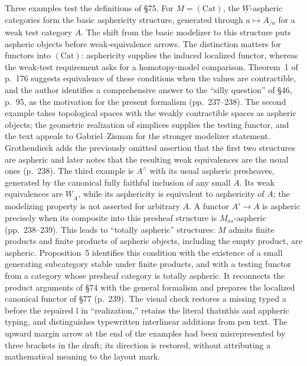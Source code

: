 Three examples test the definitions of \S75. For $M=(\mathrm{Cat})$, the $\underline W$-aspheric categories form the basic asphericity structure, generated through $a\mapsto A_{/a}$ for a weak test category $A$. The shift from the basic modelizer to this structure puts aspheric objects before weak-equivalence arrows. The distinction matters for functors into $(\mathrm{Cat})$: asphericity supplies the induced localized functor, whereas the weak-test requirement asks for a homotopy-model comparison. Theorem~1 of p.\ 176 suggests equivalence of these conditions when the values are contractible, and the author identifies a comprehensive answer to the “silly question” of \S46, p.\ 95, as the motivation for the present formalism (pp.\ 237--238). The second example takes topological spaces with the weakly contractible spaces as aspheric objects; the geometric realization of simplices supplies the testing functor, and the text appeals to Gabriel--Zisman for the stronger modelizer statement. Grothendieck adds the previously omitted assertion that the first two structures are aspheric and later notes that the resulting weak equivalences are the usual ones (p.\ 238). The third example is $A^\wedge$ with its usual aspheric presheaves, generated by the canonical fully faithful inclusion of any small $A$. Its weak equivalences are $\underline W_A$, while its asphericity is equivalent to asphericity of $A$; the modelizing property is not asserted for arbitrary $A$. A functor $A'\to A$ is aspheric precisely when its composite into this presheaf structure is $M_{as}$-aspheric (pp.\ 238--239). This leads to “totally aspheric” structures: $M$ admits finite products and finite products of aspheric objects, including the empty product, are aspheric. Proposition~5 identifies this condition with the existence of a small generating subcategory stable under finite products, and with a testing functor from a category whose presheaf category is totally aspheric. It reconnects the product arguments of \S74 with the general formalism and prepares the localized canonical functor of \S77 (p.\ 239). The visual check restores a missing typed a before the repaired l in “realization,” retains the literal thatnthis and appheric typing, and distinguishes typewritten interlinear additions from pen text. The upward margin arrow at the end of the examples had been misrepresented by three brackets in the draft; its direction is restored, without attributing a mathematical meaning to the layout mark.


